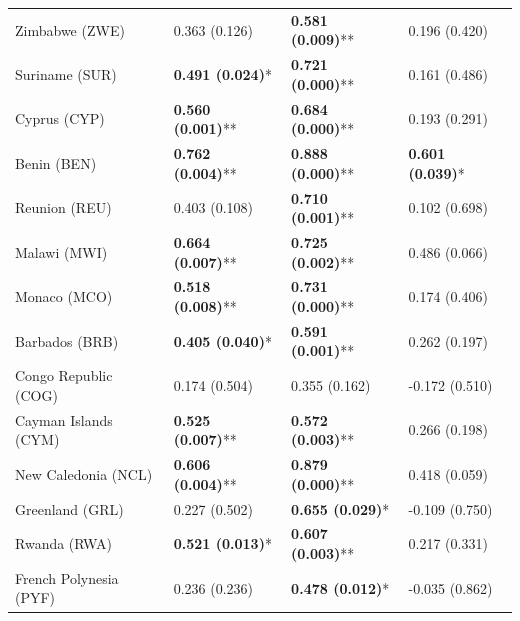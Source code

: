 \begin{longtable}{p{5cm}p{3cm}p{3cm}p{5cm}}
Zimbabwe (ZWE) & \textcolor{atlOrange600}{0.363 (0.126)} & \textcolor{atlLime600}{\textbf{0.581 (0.009)}**} & \textcolor{atlOrange600}{0.196 (0.420)} \\
Suriname (SUR) & \textcolor{atlLime600}{\textbf{0.491 (0.024)}*} & \textcolor{atlLime600}{\textbf{0.721 (0.000)}**} & \textcolor{atlOrange600}{0.161 (0.486)} \\
Cyprus (CYP) & \textcolor{atlLime600}{\textbf{0.560 (0.001)}**} & \textcolor{atlLime600}{\textbf{0.684 (0.000)}**} & \textcolor{atlOrange600}{0.193 (0.291)} \\
Benin (BEN) & \textcolor{atlLime600}{\textbf{0.762 (0.004)}**} & \textcolor{atlLime600}{\textbf{0.888 (0.000)}**} & \textcolor{atlLime600}{\textbf{0.601 (0.039)}*} \\
Reunion (REU) & \textcolor{atlOrange600}{0.403 (0.108)} & \textcolor{atlLime600}{\textbf{0.710 (0.001)}**} & \textcolor{atlOrange600}{0.102 (0.698)} \\
Malawi (MWI) & \textcolor{atlLime600}{\textbf{0.664 (0.007)}**} & \textcolor{atlLime600}{\textbf{0.725 (0.002)}**} & \textcolor{atlOrange600}{0.486 (0.066)} \\
Monaco (MCO) & \textcolor{atlLime600}{\textbf{0.518 (0.008)}**} & \textcolor{atlLime600}{\textbf{0.731 (0.000)}**} & \textcolor{atlOrange600}{0.174 (0.406)} \\
Barbados (BRB) & \textcolor{atlLime600}{\textbf{0.405 (0.040)}*} & \textcolor{atlLime600}{\textbf{0.591 (0.001)}**} & \textcolor{atlOrange600}{0.262 (0.197)} \\
Congo Republic (COG) & \textcolor{atlOrange600}{0.174 (0.504)} & \textcolor{atlOrange600}{0.355 (0.162)} & \textcolor{atlOrange600}{-0.172 (0.510)} \\
Cayman Islands (CYM) & \textcolor{atlLime600}{\textbf{0.525 (0.007)}**} & \textcolor{atlLime600}{\textbf{0.572 (0.003)}**} & \textcolor{atlOrange600}{0.266 (0.198)} \\
New Caledonia (NCL) & \textcolor{atlLime600}{\textbf{0.606 (0.004)}**} & \textcolor{atlLime600}{\textbf{0.879 (0.000)}**} & \textcolor{atlOrange600}{0.418 (0.059)} \\
Greenland (GRL) & \textcolor{atlOrange600}{0.227 (0.502)} & \textcolor{atlLime600}{\textbf{0.655 (0.029)}*} & \textcolor{atlOrange600}{-0.109 (0.750)} \\
Rwanda (RWA) & \textcolor{atlLime600}{\textbf{0.521 (0.013)}*} & \textcolor{atlLime600}{\textbf{0.607 (0.003)}**} & \textcolor{atlOrange600}{0.217 (0.331)} \\
French Polynesia (PYF) & \textcolor{atlOrange600}{0.236 (0.236)} & \textcolor{atlLime600}{\textbf{0.478 (0.012)}*} & \textcolor{atlOrange600}{-0.035 (0.862)} \\

\end{longtable}
